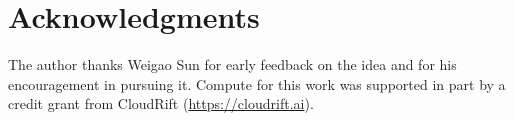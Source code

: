 \documentclass{article}
\newif\ifreview
\theoremstyle{definition}
\begin{document}
\ifreview\else
  \section*{Acknowledgments}
  The author thanks Weigao Sun for early feedback on the idea and for his
  encouragement in pursuing it. Compute for this work was supported in part by
  a credit grant from CloudRift (\url{https://cloudrift.ai}).
\fi





\end{document}
